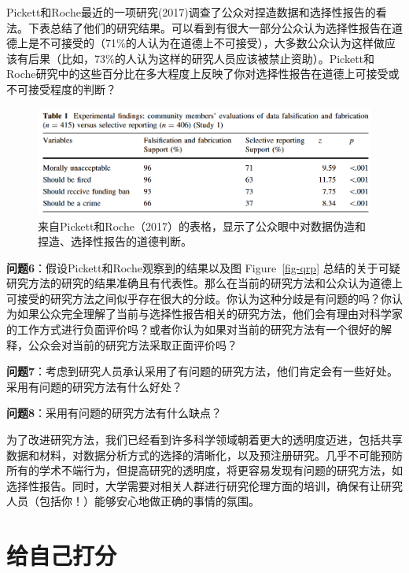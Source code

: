 \documentclass[
  letterpaper,
  DIV=11,
  numbers=noendperiod]{scrreprt}
\begin{document}
Pickett和Roche最近的一项研究(2017)调查了公众对捏造数据和选择性报告的看法。下表总结了他们的研究结果。可以看到有很大一部分公众认为选择性报告在道德上是不可接受的（71\%的人认为在道德上不可接受），大多数公众认为这样做应该有后果（比如，73\%的人认为这样的研究人员应该被禁止资助）。Pickett和Roche研究中的这些百分比在多大程度上反映了你对选择性报告在道德上可接受或不可接受程度的判断？

\begin{figure}

{\centering \includegraphics[width=1\textwidth,height=\textheight]{images/picketroche.png}

}

\caption{\label{fig-pickettroche}来自Pickett和Roche（2017）的表格，显示了公众眼中对数据伪造和捏造、选择性报告的道德判断。}

\end{figure}

\textbf{问题6}：假设Pickett和Roche观察到的结果以及图
Figure~\ref{fig-qrp}
总结的关于可疑研究方法的研究的结果准确且有代表性。那么在当前的研究方法和公众认为道德上可接受的研究方法之间似乎存在很大的分歧。你认为这种分歧是有问题的吗？你认为如果公众完全理解了当前与选择性报告相关的研究方法，他们会有理由对科学家的工作方式进行负面评价吗？或者你认为如果对当前的研究方法有一个很好的解释，公众会对当前的研究方法采取正面评价吗？

\textbf{问题7}：考虑到研究人员承认采用了有问题的研究方法，他们肯定会有一些好处。采用有问题的研究方法有什么好处？

\textbf{问题8}：采用有问题的研究方法有什么缺点？

为了改进研究方法，我们已经看到许多科学领域朝着更大的透明度迈进，包括共享数据和材料，对数据分析方式的选择的清晰化，以及预注册研究。几乎不可能预防所有的学术不端行为，但提高研究的透明度，将更容易发现有问题的研究方法，如选择性报告。同时，大学需要对相关人群进行研究伦理方面的培训，确保有让研究人员（包括你！）能够安心地做正确的事情的氛围。

\hypertarget{ux7ed9ux81eaux5df1ux6253ux5206}{%
\section{给自己打分}\label{ux7ed9ux81eaux5df1ux6253ux5206}}
\end{document}
